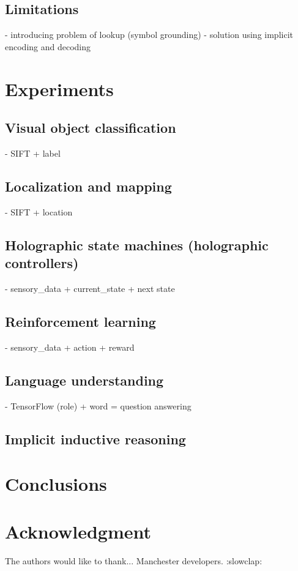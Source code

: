 \documentclass[conference]{IEEEtran}
\begin{document}
\subsection{Limitations}

- introducing problem of lookup (symbol grounding)
- solution using implicit encoding and decoding

\section{Experiments}

\subsection{Visual object classification}
- SIFT + label
\subsection{Localization and mapping}
- SIFT + location
\subsection{Holographic state machines (holographic controllers)}
- sensory\_data + current\_state + next state
\subsection{Reinforcement learning}
- sensory\_data + action + reward
\subsection{Language understanding}
- TensorFlow (role) + word = question answering
\subsection{Implicit inductive reasoning}

\section{Conclusions}


\section*{Acknowledgment}

The authors would like to thank... Manchester developers. :slowclap:



 





\end{document}
